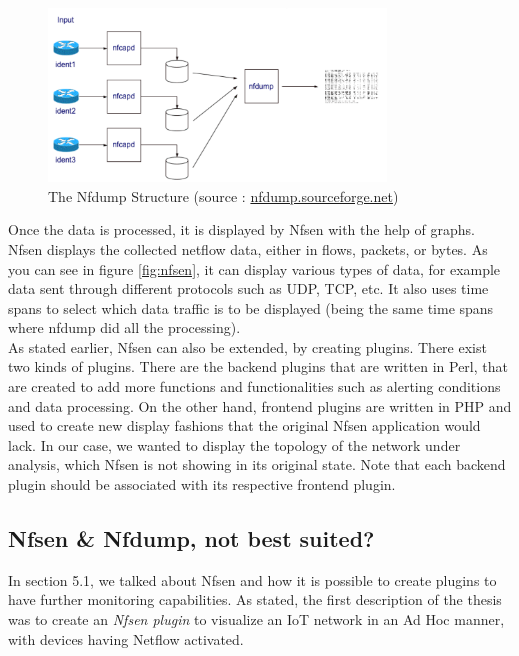 \begin{figure}[!h]
	\centering
	\includegraphics[width=0.8\textwidth]{res/nfdump.png}
	\caption{The Nfdump Structure (source : \url{nfdump.sourceforge.net})}
	\label{fig:nfdump}
\end{figure}

Once the data is processed, it is displayed by Nfsen with the help of graphs. Nfsen displays the collected netflow data, either in flows, packets, or bytes. As you can see in figure \ref{fig:nfsen}, it can display various types of data, for example data sent through different protocols such as UDP, TCP, etc. It also uses time spans to select which data traffic is to be displayed (being the same time spans where nfdump did all the processing).\\

As stated earlier, Nfsen can also be extended, by creating plugins. There exist two kinds of plugins. There are the backend plugins that are written in Perl, that are created to add more functions and functionalities such as alerting conditions and data processing. On the other hand, frontend plugins are written in PHP and used to create new display fashions that the original Nfsen application would lack. In our case, we wanted to display the topology of the network under analysis, which Nfsen is not showing in its original state. Note that each backend plugin should be associated with its respective frontend plugin.

\subsection{Nfsen \& Nfdump, not best suited?}

In section 5.1, we talked about Nfsen and how it is possible to create plugins to have further monitoring capabilities. As stated, the first description of the thesis was to create an \textit{Nfsen plugin} to visualize an IoT network in an Ad Hoc manner, with devices having Netflow activated.\\


